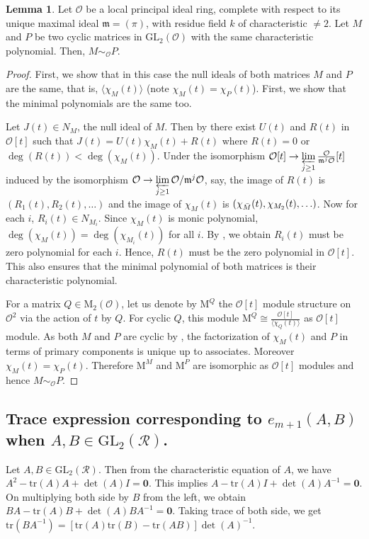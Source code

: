\documentclass[10pt,twoside]{amsart}
\newcommand{\GL}{\mathrm{GL}}
\newcommand{\tr}{\mathrm{tr}}
\newcommand{\M}{\mathrm{M}}
\theoremstyle{definition}
\theoremstyle{definition}
\newtheorem{lemma}[theorem]{Lemma}
\begin{document}
\begin{lemma}{\label{conjugacycyclic}}
Let $\mathcal{O}$ be a local principal ideal ring, complete with respect to its unique maximal ideal $\mathfrak{m} = (\pi)$, with residue field $k$ of characteristic $\neq 2$. Let $M$ and $P$ be two cyclic matrices in $\GL_2(\mathcal{O})$ with the same characteristic polynomial. Then, $M \sim_{\mathcal{O}} P$.
\end{lemma}
\begin{proof}
First, we show that in this case the null ideals of both matrices $M$ and $P$ are the same, that is, $\langle\chi_M(t) \rangle$ (note $\chi_M(t) = \chi_P(t)$). First, we show that the minimal polynomials are the same too. 
     
Let $J(t)\in N_M$, the null ideal of $M$. Then by \cite[Theorem 2.14]{JacobsonAlgebraBook85} there exist $U(t)$ and $R(t)$ in $\mathcal{O}[t]$ such that $J(t) = U(t) \chi_M(t) + R(t)$ where $R(t) = 0$ or $\deg(R(t)) < \deg(\chi_M(t))$. Under the isomorphism $\mathcal{O}[t] \rightarrow \varprojlim\limits_{j\geq 1} \frac{\mathcal{O}}{\mathfrak{m}^j\mathcal{O}}[t]$ induced by the isomorphism $\mathcal{O}\rightarrow \varprojlim\limits_{j\geq 1} \mathcal{O}/\mathfrak{m}^j\mathcal{O}$, say, the image of $R(t)$ is $(R_1(t), R_2(t),\ldots)$ and the image of $\chi_M(t)$ is $(\chi_{\Bar{M}}(t),\chi_{M_2}(t),\ldots)$. Now for each $i$, $R_i(t)\in N_{M_i}$. Since $\chi_M(t)$ is monic polynomial, $\deg(\chi_M(t)) = \deg(\chi_{M_i}(t))$ for all $i$. By \cite[Corollary 2.3]{PRS2026}, we obtain $R_i(t)$ must be zero polynomial for each $i$. Hence, $R(t)$ must be the zero polynomial in $\mathcal{O}[t]$. This also ensures that the minimal polynomial of both matrices is their characteristic polynomial.

For a matrix $Q\in \M_2(\mathcal{O})$, let us denote by $\M^Q$ the $\mathcal{O}[t]$ module structure on $\mathcal{O}^2$ via the action of $t$ by $Q$. For cyclic $Q$, this module $\M^Q \cong \frac{\mathcal{O}[t]}{\langle \chi_Q(t)\rangle}$ as $\mathcal{O}[t]$ module. As both $M$ and $P$ are cyclic by \cite[Theorem 5.1 (2)]{Snapper1950},  the factorization of $\chi_{M}(t)$ and $P$ in terms of primary components is unique up to associates. Moreover $\chi_M(t)=\chi_{P}(t)$. Therefore $\M^M$ and $\M^{P}$ are isomorphic as $\mathcal{O}[t]$ modules and hence $M\sim _{\mathcal{O}} P$. 
 \end{proof}

 

\iffalse
\subsection{Trace expression corresponding to $e_{m+1}(A,B)$ when $A,B\in \GL_2(\mathcal{R})$.} Let $A,B\in \GL_2(\mathcal{R})$. Then from the characteristic equation of $A$, we have $A^2-\tr(A)A+\det(A)I=\mathbf{0}$. This implies $A-\tr(A)I+\det(A)A^{-1}=\mathbf{0}$. On multiplying both side by $B$ from the left, we obtain $BA-\tr(A)B+\det(A)BA^{-1}=\mathbf{0}$. Taking trace of both side, we get $\tr(BA^{-1})=[\tr(A)\tr(B)-\tr(AB)]\det(A)^{-1}$.
\end{document}
